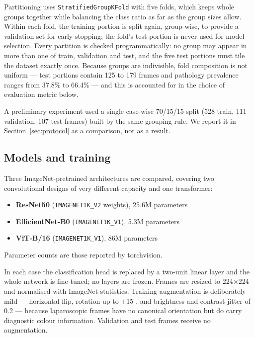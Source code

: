 \documentclass[preprint,12pt]{elsarticle}
\begin{document}
Partitioning uses \texttt{StratifiedGroupKFold} with five folds, which keeps whole groups together while balancing the class ratio as far as the group sizes allow. Within each fold, the training portion is split again, group-wise, to provide a validation set for early stopping; the fold's test portion is never used for model selection. Every partition is checked programmatically: no group may appear in more than one of train, validation and test, and the five test portions must tile the dataset exactly once. Because groups are indivisible, fold composition is not uniform --- test portions contain 125 to 179 frames and pathology prevalence ranges from 37.8\% to 66.4\% --- and this is accounted for in the choice of evaluation metric below.

A preliminary experiment used a single case-wise 70/15/15 split (528 train, 111 validation, 107 test frames) built by the same grouping rule. We report it in Section~\ref{sec:protocol} as a comparison, not as a result.

\subsection{Models and training}
\label{sec:models}

Three ImageNet-pretrained architectures are compared, covering two convolutional designs of very different capacity and one transformer:

\begin{itemize}\item \textbf{ResNet50} \cite{ref_resnet} (\texttt{IMAGENET1K\_V2} weights), 25.6M parameters\item \textbf{EfficientNet-B0} \cite{ref_efficientnet} (\texttt{IMAGENET1K\_V1}), 5.3M parameters\item \textbf{ViT-B/16} \cite{ref_vit} (\texttt{IMAGENET1K\_V1}), 86M parameters\end{itemize}
Parameter counts are those reported by torchvision.

In each case the classification head is replaced by a two-unit linear layer and the whole network is fine-tuned; no layers are frozen. Frames are resized to 224$\times$224 and normalised with ImageNet statistics. Training augmentation is deliberately mild --- horizontal flip, rotation up to $\pm$15$^{\circ}$, and brightness and contrast jitter of 0.2 --- because laparoscopic frames have no canonical orientation but do carry diagnostic colour information. Validation and test frames receive no augmentation.
\end{document}
